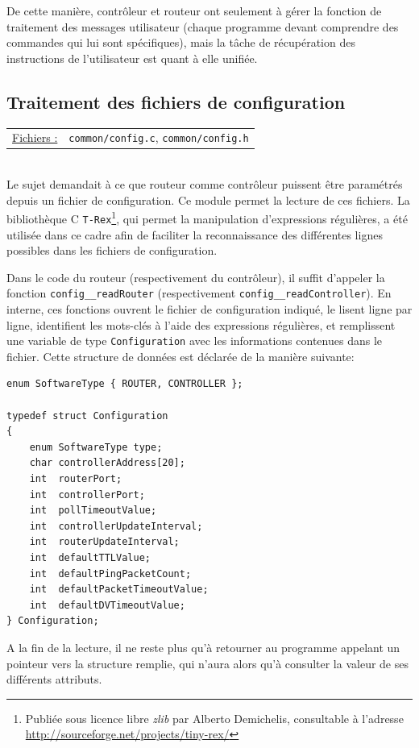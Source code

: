 \documentclass[a4paper,11pt]{article}
\begin{document}
De cette manière, contrôleur et routeur ont seulement à gérer la fonction de traitement des messages utilisateur (chaque programme devant comprendre des commandes qui lui sont spécifiques), mais la tâche de récupération des instructions de l'utilisateur est quant à elle unifiée.

\subsection{Traitement des fichiers de configuration}

\begin{tabularx}{\linewidth}{lX}
\underline{Fichiers :} & \texttt{common/config.c}, \texttt{common/config.h}\\
\end{tabularx}\\

Le sujet demandait à ce que routeur comme contrôleur puissent être paramétrés depuis un fichier de configuration. Ce module permet la lecture de ces fichiers. La bibliothèque C \texttt{T-Rex}\footnote{Publiée sous licence libre \textit{zlib} par Alberto Demichelis, consultable à l'adresse \url{http://sourceforge.net/projects/tiny-rex/}}, qui permet la manipulation d'expressions régulières, a été utilisée dans ce cadre afin de faciliter la reconnaissance des différentes lignes possibles dans les fichiers de configuration.

Dans le code du routeur (respectivement du contrôleur), il suffit d'appeler la fonction \texttt{config\_\_readRouter} (respectivement \texttt{config\_\_readController}). En interne, ces fonctions ouvrent le fichier de configuration indiqué, le lisent ligne par ligne, identifient les mots-clés à l'aide des expressions régulières, et remplissent une variable de type \texttt{Configuration} avec les informations contenues dans le fichier. Cette structure de données est déclarée de la manière suivante:

\begin{lstlisting}
enum SoftwareType { ROUTER, CONTROLLER };

typedef struct Configuration
{
	enum SoftwareType type;
	char controllerAddress[20];
	int  routerPort;
	int  controllerPort;
	int  pollTimeoutValue;
	int  controllerUpdateInterval;
	int  routerUpdateInterval;
	int  defaultTTLValue;
	int  defaultPingPacketCount;
	int  defaultPacketTimeoutValue;
	int  defaultDVTimeoutValue;
} Configuration;
\end{lstlisting}

A la fin de la lecture, il ne reste plus qu'à retourner au programme appelant un pointeur vers la structure remplie, qui n'aura alors qu'à consulter la valeur de ses différents attributs.
\end{document}
